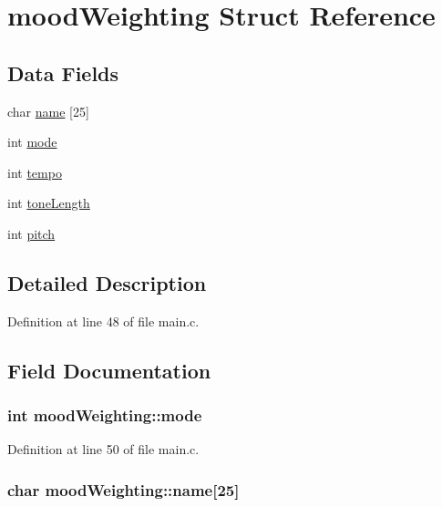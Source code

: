 \hypertarget{structmood_weighting}{\section{mood\+Weighting Struct Reference}
\label{structmood_weighting}
}
\subsection*{Data Fields}
\begin{DoxyCompactItemize}
\item 
char \hyperlink{structmood_weighting_af578d935b7734ea6944946a2ad9132af}{name} \mbox{[}25\mbox{]}
\item 
int \hyperlink{structmood_weighting_a61010f3a9441ad3cabbe94a31a64dad5}{mode}
\item 
int \hyperlink{structmood_weighting_a9b2180e8a4aab163ae48d0a66269a840}{tempo}
\item 
int \hyperlink{structmood_weighting_ab9e917ae02761f06d11c59645a45536d}{tone\+Length}
\item 
int \hyperlink{structmood_weighting_a27410ec4f299961816407657a3e241e8}{pitch}
\end{DoxyCompactItemize}


\subsection{Detailed Description}


Definition at line 48 of file main.\+c.



\subsection{Field Documentation}
\hypertarget{structmood_weighting_a61010f3a9441ad3cabbe94a31a64dad5}{
\subsubsection[{mode}]{\setlength{\rightskip}{0pt plus 5cm}int mood\+Weighting\+::mode}}\label{structmood_weighting_a61010f3a9441ad3cabbe94a31a64dad5}


Definition at line 50 of file main.\+c.

\hypertarget{structmood_weighting_af578d935b7734ea6944946a2ad9132af}{
\subsubsection[{name}]{\setlength{\rightskip}{0pt plus 5cm}char mood\+Weighting\+::name\mbox{[}25\mbox{]}}}\label{structmood_weighting_af578d935b7734ea6944946a2ad9132af}


